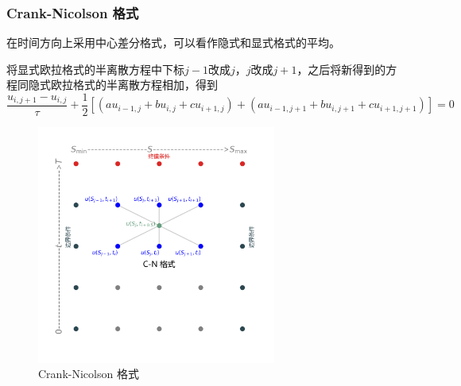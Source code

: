 \documentclass{article}
\begin{document}
 






\subsubsection{Crank-Nicolson 格式}

在时间方向上采用中心差分格式，可以看作隐式和显式格式的平均。

将显式欧拉格式的半离散方程中下标$j-1$改成$j$，$j$改成$j+1$，之后将新得到的方程同隐式欧拉格式的半离散方程相加，得到
$$\frac{u_{i, j+1} - u_{i, j}}{\tau} + \frac{1}{2}[(au_{i-1, j} + bu_{i, j} + cu_{i+1, j}) + (au_{i-1, j+1} + bu_{i, j+1} + cu_{i+1, j+1})] = 0$$


\begin{figure}[H]
  \centering
  \includegraphics[width=0.7\textwidth,height=0.7\textwidth]{Images/4_CNEu.png}
  \caption{Crank-Nicolson 格式}
  \label{fig:4_CNEu}
\end{figure} 
\end{document}
